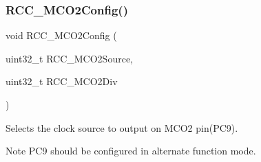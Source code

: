 \subsubsection{\texorpdfstring{R\+C\+C\+\_\+\+M\+C\+O2\+Config()}{RCC\_MCO2Config()}}
{\footnotesize\ttfamily void R\+C\+C\+\_\+\+M\+C\+O2\+Config (\begin{DoxyParamCaption}\item[{uint32\+\_\+t}]{R\+C\+C\+\_\+\+M\+C\+O2\+Source,  }\item[{uint32\+\_\+t}]{R\+C\+C\+\_\+\+M\+C\+O2\+Div }\end{DoxyParamCaption})}



Selects the clock source to output on M\+C\+O2 pin(\+P\+C9). 

\begin{DoxyNote}{Note}
P\+C9 should be configured in alternate function mode. 
\end{DoxyNote}

